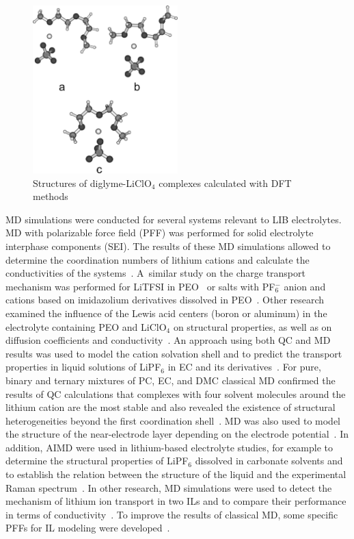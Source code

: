 \begin{figure}[ht]
    \centering
    \includegraphics[width=0.5\textwidth]{img/1-introduction/li-clo4-diglyme.png}
    \caption{Structures of diglyme-LiClO$_4$ complexes calculated with DFT methods~\cite{pcm-2}}
    \label{fig:introduction-li-clo4-diglyme}
\end{figure}

MD simulations were conducted for several systems relevant to LIB electrolytes. MD with polarizable force field (PFF) was performed for solid electrolyte interphase components (SEI). The results of these MD simulations allowed to determine the coordination numbers of lithium cations and calculate the conductivities of the systems~\cite{li-md-1,li-md-13}. A~similar study on the charge transport mechanism was performed for LiTFSI in PEO~\cite{li-md-2,li-md-15} or salts with PF$_6^{-}$ anion and cations based on imidazolium derivatives dissolved in PEO~\cite{li-md-3}. Other research examined the influence of the Lewis acid centers (boron or aluminum) in the electrolyte containing PEO and LiClO$_4$ on structural properties, as well as on diffusion coefficients and conductivity~\cite{li-md-16}. An approach using both QC and MD results was used to model the cation solvation shell and to predict the transport properties in liquid solutions of LiPF$_6$ in EC and its derivatives~\cite{li-md-6,li-md-11,li-diffusion-dft-aimd}. For pure, binary and ternary mixtures of PC, EC, and DMC classical MD confirmed the results of QC calculations that complexes with four solvent molecules around the lithium cation are the most stable and also revealed the existence of structural heterogeneities beyond the first coordination shell~\cite{li-md-10}. MD was also used to model the structure of the near-electrode layer depending on the electrode potential~\cite{li-md-12}. In addition, AIMD were used in lithium-based electrolyte studies, for example to determine the structural properties of LiPF$_6$ dissolved in carbonate solvents and to establish the relation between the structure of the liquid and the experimental Raman spectrum~\cite{li-md-17}. In other research, MD simulations were used to detect the mechanism of lithium ion transport in two ILs and to compare their performance in terms of conductivity~\cite{li-md-14}. To improve the results of classical MD, some specific PFFs for IL modeling were developed~\cite{li-md-4,li-md-5,li-md-7,li-md-8,li-md-9}. 


